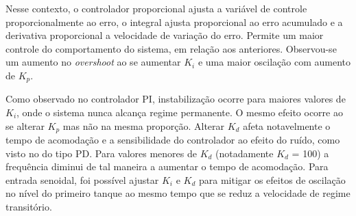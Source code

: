 
Nesse contexto, o controlador proporcional ajusta a variável de controle proporcionalmente ao erro, o integral ajusta proporcional ao erro acumulado e a derivativa proporcional a velocidade de variação do erro. Permite um maior controle do comportamento do sistema, em relação aos anteriores. Observou-se um aumento no \emph{overshoot} ao se aumentar $K_i$ e uma maior oscilação com aumento de $K_p$.

Como observado no controlador PI, instabilização ocorre para maiores valores de $K_i$, onde o sistema nunca alcança regime permanente. O mesmo efeito ocorre ao se alterar $K_p$ mas não na mesma proporção. Alterar $K_d$ afeta notavelmente o tempo de acomodação e a sensibilidade do controlador ao efeito do ruído, como visto no do tipo PD. Para valores menores de $K_d$ (notadamente $K_d$ = 100) a frequência diminui de tal maneira a aumentar o tempo de acomodação. Para entrada senoidal, foi possível ajustar $K_i$ e $K_d$ para mitigar os efeitos de oscilação no nível do primeiro tanque ao mesmo tempo que se reduz a velocidade de regime transitório. 

